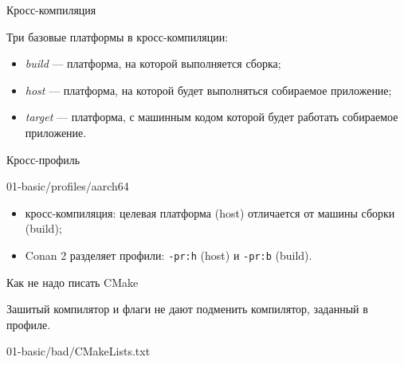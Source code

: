 \documentclass[compress, 8pt, aspectratio=169]{beamer}
\begin{document}
\begin{frame}[fragile]{Кросс-компиляция}

  Три базовые платформы в кросс-компиляции:

  \bigbreak

  \begin{itemize}

    \item \textit{build} --- платформа, на которой выполняется сборка;

    \item \textit{host} --- платформа, на которой будет выполняться
      собираемое приложение;

    \item \textit{target} --- платформа, с машинным кодом которой будет
      работать собираемое приложение\footnotemark{}.

  \end{itemize}


\end{frame}

\begin{frame}[fragile]{Кросс-профиль}

    {01-basic/profiles/aarch64}

  \bigbreak

  \begin{itemize}

    \item кросс-компиляция: целевая платформа (host) отличается от
      машины сборки (build);

    \item Conan 2 разделяет профили: \texttt{-pr:h} (host) и
      \texttt{-pr:b} (build).

  \end{itemize}

\end{frame}

\begin{frame}[fragile]{Как не надо писать CMake}

  Зашитый компилятор и флаги не дают подменить компилятор, заданный в профиле.

  \bigbreak

    {01-basic/bad/CMakeLists.txt}

\end{frame}
\end{document}
